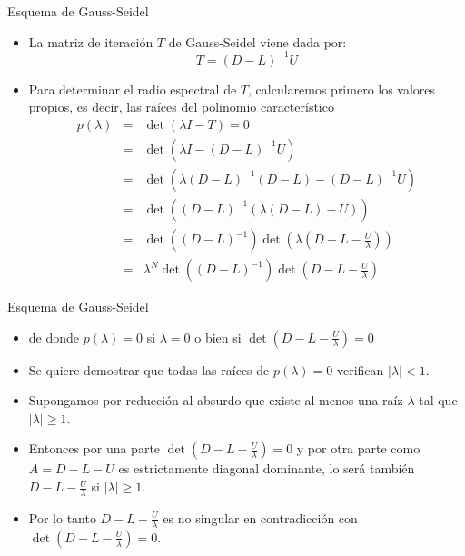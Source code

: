 \documentclass[10pt]{beamer}
\begin{document}
  \begin{frame}{Esquema de Gauss-Seidel}
  \begin{itemize}
    \item<1-> La matriz de iteraci\'on $T$ de Gauss-Seidel viene dada por:
    $$
    T=(D-L)^{-1}U
    $$    
    \item<2-> Para determinar el radio espectral de $T$, calcularemos primero los valores propios, es decir, las ra\'ices del polinomio caracter\'istico
\begin{eqnarray}
\nonumber p(\lambda) & =  & \det(\lambda I - T) = 0\\
\nonumber  & = & \det(\lambda I - (D-L)^{-1}U)\\
 \nonumber & = & \det(\lambda  (D-L)^{-1}(D-L) - (D-L)^{-1}U)\\
 \nonumber & = & \det((D-L)^{-1}(\lambda (D-L)-U))\\
\nonumber  & = & \det((D-L)^{-1})\det\left(\lambda(D - L-\frac{U}{\lambda})\right)\\
 \nonumber & = & \lambda^N\det((D-L)^{-1})\det\left(D - L-\frac{U}{\lambda}\right)
\end{eqnarray}
\end{itemize}
\end{frame}
  \begin{frame}{Esquema de Gauss-Seidel}
  \begin{itemize}
  \item<1-> de donde $p(\lambda) = 0$ si $\lambda = 0$ o bien si $\det\left(D - L-\frac{U}{\lambda}\right)=0$
  \item <2->Se quiere demostrar que todas las ra\'ices de $p(\lambda) = 0$ verifican $|\lambda| < 1$.
  \item<3->Supongamos por reducci\'on al absurdo que existe al menos una ra\'iz $\lambda$ tal que $|\lambda| \geq 1$.
  \item<4->Entonces por una parte $\det\left(D - L-\frac{U}{\lambda}\right)=0$ y por otra parte como $A = D - L - U$ es estrictamente diagonal dominante, lo ser\'a tambi\'en $D - L-\frac{U}{\lambda}$ si $|\lambda| \geq 1$.
  \item<5->Por lo tanto $D - L-\frac{U}{\lambda}$ es no singular en contradicci\'on con $\det\left(D - L-\frac{U}{\lambda}\right) = 0$.
  \end{itemize}
  \end{frame}
\end{document}

